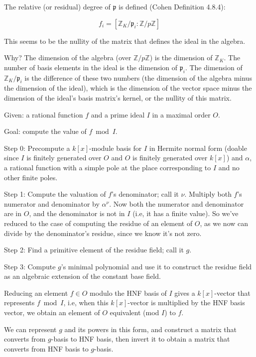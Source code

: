 The relative (or residual) degree of ${\mathfrak p}$ is defined (Cohen Definition 4.8.4):

$$f_i = [{\mathbb Z}_K/{\mathfrak p}_i : {\mathbb Z}/p{\mathbb Z}]$$

This seems to be the nullity of the matrix that defines the ideal in the algebra.

Why?  The dimension of the algebra (over ${\mathbb Z}/p{\mathbb Z}$)
is the dimension of ${\mathbb Z}_K$.  The number of basis elements in
the ideal is the dimension of ${\mathfrak p}_i$.  The dimension of
${\mathbb Z}_K/{\mathfrak p}_i$ is the difference of these two numbers
(the dimension of the algebra minus the dimension of the ideal), which
is the dimension of the vector space minus the dimension of the
ideal's basis matrix's kernel, or the nullity of this matrix.

\vfill\eject
{}

Given: a rational function $f$ and a prime ideal $I$ in a maximal order $O$.

Goal: compute the value of $f \bmod I$.

Step 0: Precompute a $k[x]$-module basis for $I$ in Hermite normal form (doable since $I$ is finitely generated over $O$ and $O$ is finitely generated over $k[x]$) and $\alpha$, a rational function with a simple pole at the place corresponding to $I$ and no other finite poles.

Step 1: Compute the valuation of $f$'s denominator; call it $\nu$.  Multiply both $f$'s numerator and denominator by $\alpha^\nu$.  Now both the numerator and denominator are in $O$, and the denominator is not in $I$ (i.e, it has a finite value).  So we've reduced to the case of computing the residue of an element of $O$, as we now can divide by the denominator's residue, since we know it's not zero.

Step 2: Find a primitive element of the residue field; call it $g$.

Step 3: Compute $g$'s minimal polynomial and use it to construct the residue field as an algebraic extension of the constant base field.

Reducing an element $f \in O$ modulo the HNF basis of $I$ gives a $k[x]$-vector that represents $f \bmod I$, i.e, when this $k[x]$-vector is multiplied by the HNF basis vector, we obtain an element of $O$ equivalent (mod $I$) to $f$.

We can represent $g$ and its powers in this form, and construct a matrix that converts from $g$-basis to HNF basis, then invert it to obtain a matrix that converts from HNF basis to $g$-basis.

